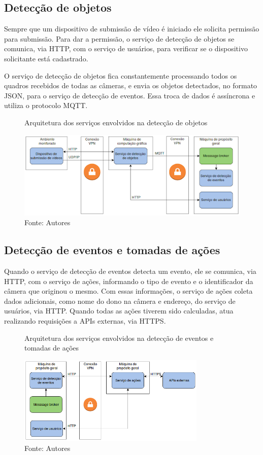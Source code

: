 \documentclass[]{politex}
\begin{document}
\subsection{Detecção de objetos}
Sempre que um dispositivo de submissão de vídeo é iniciado ele solicita permissão para submissão. Para dar a permissão, o serviço de detecção de objetos se comunica, via HTTP, com o serviço de usuários, para verificar se o dispositivo solicitante está cadastrado.

O serviço de detecção de objetos fica constantemente processando todos os quadros recebidos de todas as câmeras, e envia os objetos detectados, no formato JSON, para o serviço de detecção de eventos. Essa troca de dados é assíncrona e utiliza o protocolo MQTT.

\begin{figure}[H]
    \centering
    \caption{Arquitetura dos serviços envolvidos na detecção de objetos}
    \includegraphics[width=\textwidth]{arquitetura_objetos}
    \caption*{Fonte: Autores}
    \label{fig:arquitetura_objetos}
\end{figure}

\subsection{Detecção de eventos e tomadas de ações}
Quando o serviço de detecção de eventos detecta um evento, ele se comunica, via HTTP, com o serviço de ações, informando o tipo de evento e o identificador da câmera que originou o mesmo. Com essas informações, o serviço de ações coleta dados adicionais, como nome do dono na câmera e endereço, do serviço de usuários, via HTTP. Quando todas as ações tiverem sido calculadas, atua realizando requisições a APIs externas, via HTTPS.

\begin{figure}[H]
    \centering
    \caption{Arquitetura dos serviços envolvidos na detecção de eventos e tomadas de ações}
    \includegraphics[width=0.8\textwidth]{arquitetura_acoes}
    \caption*{Fonte: Autores}
    \label{fig:arquitetura_acoes}
\end{figure}
\end{document}

